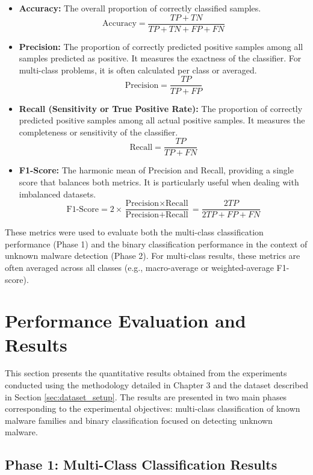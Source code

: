 \begin{itemize}
    \item \textbf{Accuracy:} The overall proportion of correctly classified samples.
    $$ \text{Accuracy} = \frac{TP + TN}{TP + TN + FP + FN} $$
    \item \textbf{Precision:} The proportion of correctly predicted positive samples among all samples predicted as positive. It measures the exactness of the classifier. For multi-class problems, it is often calculated per class or averaged.
    $$ \text{Precision} = \frac{TP}{TP + FP} $$
    \item \textbf{Recall (Sensitivity or True Positive Rate):} The proportion of correctly predicted positive samples among all actual positive samples. It measures the completeness or sensitivity of the classifier.
    $$ \text{Recall} = \frac{TP}{TP + FN} $$
    \item \textbf{F1-Score:} The harmonic mean of Precision and Recall, providing a single score that balances both metrics. It is particularly useful when dealing with imbalanced datasets.
    $$ \text{F1-Score} = 2 \times \frac{\text{Precision} \times \text{Recall}}{\text{Precision} + \text{Recall}} = \frac{2TP}{2TP + FP + FN} $$
\end{itemize}
These metrics were used to evaluate both the multi-class classification performance (Phase 1) and the binary classification performance in the context of unknown malware detection (Phase 2). For multi-class results, these metrics are often averaged across all classes (e.g., macro-average or weighted-average F1-score).

\section{Performance Evaluation and Results}
\label{sec:performance_results}

This section presents the quantitative results obtained from the experiments conducted using the methodology detailed in Chapter 3 and the dataset described in Section \ref{sec:dataset_setup}. The results are presented in two main phases corresponding to the experimental objectives: multi-class classification of known malware families and binary classification focused on detecting unknown malware.

\subsection{Phase 1: Multi-Class Classification Results}
\label{subsec:multiclass_results}

